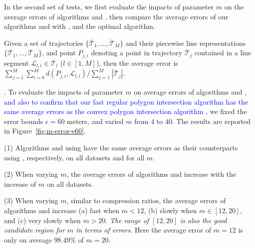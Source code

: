 {In the second set of tests, we first evaluate the impacts of parameter $m$ on the average errors of algorithms \cist and \cista, then compare the average errors of our algorithms \cist and \cista with \dps, \squishe and the optimal algorithm.

Given a set of trajectories $\{\dddot{\mathcal{T}_1}, \ldots, \dddot{\mathcal{T}}_M\}$ and their piecewise line representations $\{\overline{\mathcal{T}_1}, \ldots, \overline{\mathcal{T}}_M\}$, and point $P_{j,i}$ denoting
a point in trajectory $\dddot{\mathcal{T}}_j$ contained in a line segment $\mathcal{L}_{l,i}\in\overline{\mathcal{T}_l}$ ($l\in[1,M]$),
then the average error is $\sum_{j=1}^{M}\sum_{i=0}^{M} d(P_{j,i},
\mathcal{L}_{l,i})/\sum_{j=1}^{M}{|\dddot{\mathcal{T}}_j |}$.




.
To evaluate the impacts of parameter $m$ on average errors of algorithms \cist and \cista, 
\textcolor{blue}{and also to confirm that our fast regular polygon intersection algorithm \rpia has the same average errors as the convex polygon intersection algorithm \cpia, }
we fixed the error bounds {$\epsilon =60$ meters}, and varied $m$ from $4$ to $40$. The results are reported in Figure~\ref{fig:m-error-e60}.



\ni(1) Algorithms \cist and \cista using \rpia have the same average errors as their counterparts using \cpia, respectively, on all datasets and for all $m$.

\ni(2) When varying $m$, the average errors of algorithms \cist and \cista increase with the increase of $m$ on all datasets.

\ni(3) When varying $m$, similar to compression ratios, the average errors of
algorithms \cist and \cista increase (a) fast when $m < 12$, (b) slowly when $m
\in [12, 20]$, and (c) very slowly when $m > 20$.
\emph{The range of $[12, 20]$ is also the good candidate region for $m$ in terms of errors.}
Here the average error of $m=12$ is only on average {$98.49\%$} of $m=20$.




}
